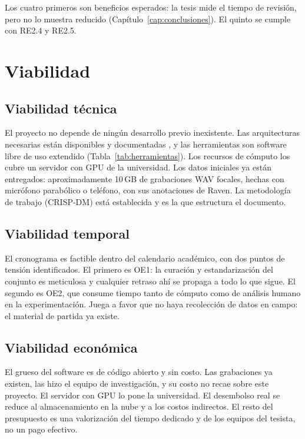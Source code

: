 Los cuatro primeros son beneficios esperados: la tesis mide el tiempo de revisión,
pero no lo muestra reducido (Capítulo~\ref{cap:conclusiones}). El quinto se
cumple con RE2.4 y RE2.5.

\section{Viabilidad}

\subsection{Viabilidad técnica}

El proyecto no depende de ningún desarrollo previo inexistente. Las
arquitecturas necesarias están disponibles y documentadas
\citep{ren_faster_2017,carion_detr_2020,zhu_deformable_2021,gong_ast_2021}, y las
herramientas son software libre de uso extendido (Tabla~\ref{tab:herramientas}).
Los recursos de cómputo los cubre un servidor con GPU de la universidad. Los datos
iniciales ya están entregados: aproximadamente 10\,GB de grabaciones WAV focales,
hechas con micrófono parabólico o teléfono, con sus anotaciones de Raven. La
metodología de trabajo (CRISP-DM) está establecida y es la que estructura el
documento.

\subsection{Viabilidad temporal}

El cronograma es factible dentro del calendario académico, con dos puntos de
tensión identificados. El primero es OE1: la curación y estandarización del
conjunto es meticulosa y cualquier retraso ahí se propaga a todo lo que sigue.
El segundo es OE2, que consume tiempo tanto de cómputo como de análisis humano
en la experimentación. Juega a favor que no haya recolección de datos en campo:
el material de partida ya existe.

\subsection{Viabilidad económica}

El grueso del software es de código abierto y sin costo. Las grabaciones ya
existen, las hizo el equipo de investigación, y su costo no recae sobre este
proyecto. El servidor con GPU lo pone la universidad. El desembolso real se
reduce al almacenamiento en la nube y a los costos indirectos. El resto del
presupuesto es una valorización del tiempo dedicado y de los equipos del tesista,
no un pago efectivo.

